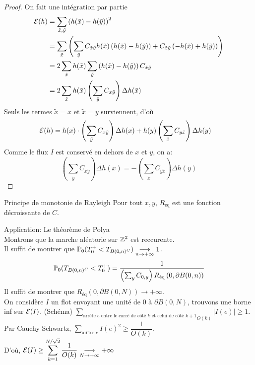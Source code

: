 \documentclass[]{report}
\begin{document}
    \begin{proof}
        On fait une intégration par partie
        \begin{align*}
            \mathcal{E}(h)&=\sum_{\tilde{x},\tilde{y}}\left(h(\tilde{x})-h(\tilde{y})\right)^2\\
            &=\sum_{\tilde{x}}\left(\sum_{\tilde{y}}C_{\tilde{x}\tilde{y}} h(\tilde{x})\left( h(\tilde{x})-h(\tilde{y})\right)+C_{\tilde{x}\tilde{y}}\left(-h(\tilde{x})+h(\tilde{y})\right)\right)\\
            &=2\sum_{\tilde{x}} h(\tilde{x})\sum_{\tilde{y}}\left(h(\tilde{x})-h(\tilde{y})\right)C_{\tilde{x}\tilde{y}}\\
            &=2\sum_{\tilde{x}}h(\tilde{x})\left(\sum_{\tilde{y}}C_{x\tilde{y}}\right)\Delta h(\tilde{x})
        \end{align*}
        Seuls les termes $\tilde{x}=x$ et $\tilde{x}=y$ surviennent, d'où
        \begin{align*}
            \mathcal{E}(h)&=h(x)\cdot \left( \sum_{\tilde{y}} C_{x\tilde{y}}\right)\Delta h(x) +h(y)\left(\sum_{\tilde{x}} C_{y\tilde{x}}\right) \Delta h(y)
        \end{align*}
        Comme le flux $I$ est conservé en dehors de $x$ et $y$, on a:
        \[\left(\sum_{\tilde{y}} C_{x\tilde{y}}\right)\Delta h(x)=-\left(\sum_{\tilde{x}}C_{y\tilde{x}}\right) \Delta h(y)\]
    \end{proof}

    \begin{tm}{Principe de monotonie de Rayleigh}{}
        Pour tout $x,y$, $R_{\text{eq}}$ est une fonction décroissante de $C$.
    \end{tm}

    Application: Le théorème de Polya\\
    Montrons que la marche aléatorie sur $\mathbb{Z}^2$ est reccurente.\\
    Il suffit de montrer que $\mathbb{P}_0(T_0^+<T_{B(0,n)^C})\underset{n\to +\infty}{\longrightarrow} 1$.
    \[\mathbb{P}_0(T_{B(0,n)^C}<T_0^+)=\dfrac{1}{\left(\sum_y C_{0,y}\right)R_{\text{éq}}\left(0,\partial B(0,n)\right)}\]
    Il suffit de montrer que $R_{\text{éq}}(0,\partial B(0,N))\to +\infty$.\\
    On considère $I$ un flot envoyant une unité de $0$ à $\partial B(0,N)$, trouvons une borne inf sur $\mathcal{E}(I)$.
    (Schéma)
    $\displaystyle{\underset{O(k)}{\sum_{\text{arrète $e$ entre le carré de côté $k$ et celui de côté $k+1$}}}\left|I(e)\right|\ge 1}$. Par Cauchy-Schwartz, $\displaystyle{\sum_{\text{arêtes $e$}}I(e)^2\ge \dfrac{1}{O(k)}}$.\\
    D'où, $\displaystyle{\mathcal{E}(I)\ge \sum_{k=1}^{N/\sqrt{2}}\dfrac{1}{O(k)}}\underset{N\to+\infty}{\longrightarrow}+\infty$
\end{document}

